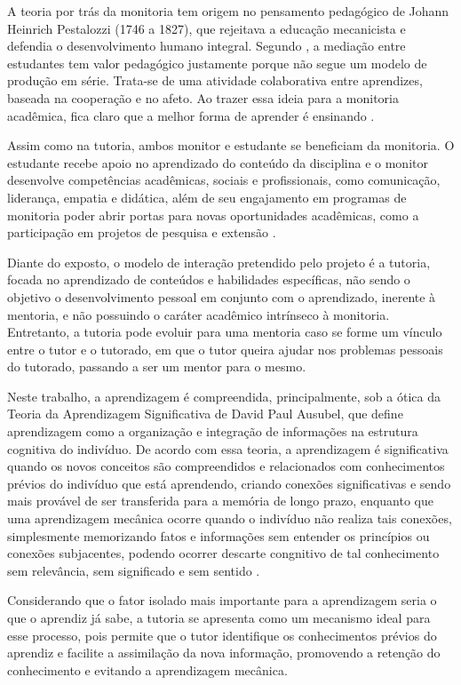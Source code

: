 A teoria por trás da monitoria tem origem no pensamento pedagógico de Johann Heinrich Pestalozzi (1746 a 1827), que rejeitava a educação mecanicista e defendia o desenvolvimento humano integral. Segundo , a mediação entre estudantes tem valor pedagógico justamente porque não segue um modelo de produção em série. Trata-se de uma atividade colaborativa entre aprendizes, baseada na cooperação e no afeto. Ao trazer essa ideia para a monitoria acadêmica, fica claro que a melhor forma de aprender é ensinando \cite{aranha2006monitoria}.

Assim como na tutoria, ambos monitor e estudante se beneficiam da monitoria. O estudante recebe apoio no aprendizado do conteúdo da disciplina e o monitor desenvolve competências acadêmicas, sociais e profissionais, como comunicação, liderança, empatia e didática, além de seu engajamento em programas de monitoria poder abrir portas para novas oportunidades acadêmicas, como a participação em projetos de pesquisa e extensão \cite{monitoria2025}.

Diante do exposto, o modelo de interação pretendido pelo projeto é a tutoria, focada no aprendizado de conteúdos e habilidades específicas, não sendo o objetivo o desenvolvimento pessoal em conjunto com o aprendizado, inerente à mentoria, e não possuindo o caráter acadêmico intrínseco à monitoria. Entretanto, a tutoria pode evoluir para uma mentoria caso se forme um vínculo entre o tutor e o tutorado, em que o tutor queira ajudar nos problemas pessoais do tutorado, passando a ser um mentor para o mesmo.

Neste trabalho, a aprendizagem é compreendida, principalmente, sob a ótica da Teoria da Aprendizagem Significativa de David Paul Ausubel, que define aprendizagem como a organização e integração de informações na estrutura cognitiva do indivíduo. De acordo com essa teoria, a aprendizagem é significativa quando os novos conceitos são compreendidos e relacionados com conhecimentos prévios do indivíduo que está aprendendo, criando conexões significativas e sendo mais provável de ser transferida para a memória de longo prazo, enquanto que uma aprendizagem mecânica ocorre quando o indivíduo não realiza tais conexões, simplesmente memorizando fatos e informações sem entender os princípios ou conexões subjacentes, podendo ocorrer descarte congnitivo de tal conhecimento sem relevância, sem significado e sem sentido \cite{junior2023olhar}.

Considerando que o fator isolado mais importante para a aprendizagem seria o que o aprendiz já sabe, a tutoria se apresenta como um mecanismo ideal para esse processo, pois permite que o tutor identifique os conhecimentos prévios do aprendiz e facilite a assimilação da nova informação, promovendo a retenção do conhecimento e evitando a aprendizagem mecânica.

